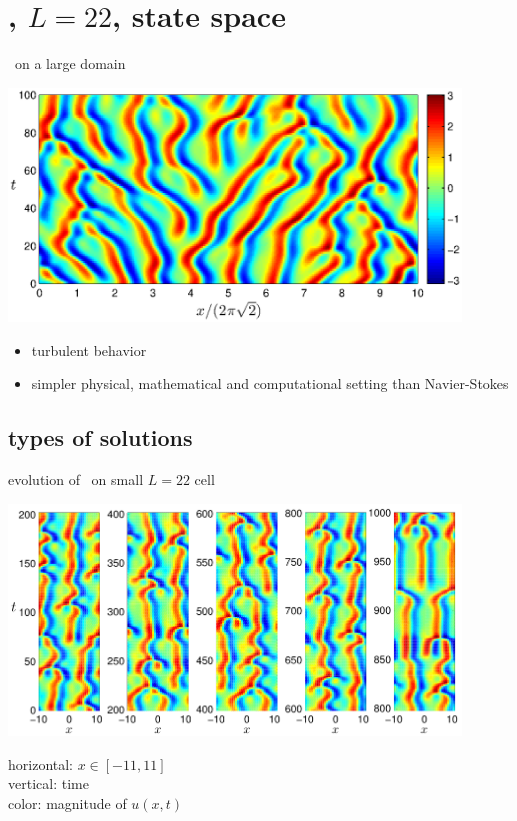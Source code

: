\documentclass{beamer}
\begin{document}
\section[KSe, $L=22$]{\KS, $L=22$, state space }
\begin{frame}{\KS\ on a large domain}

\begin{center}
  \includegraphics[width=0.9\textwidth,height=0.5\textheight,clip=true]
  {../../figs/ks_largeL_cbar}
\end{center}

\begin{itemize}
\item turbulent behavior
\item simpler physical, mathematical and computational setting than Navier-Stokes
\end{itemize}

\end{frame}


\subsection{types of solutions}
\begin{frame}{evolution of \KS\ on small $L=22$ cell}
\begin{center}
  \includegraphics[width=0.9\textwidth,clip=true]{../../figs/ks_L22_long_orbit}
\end{center}
horizontal: $x \in [-11,11]$
\\
vertical: time
\\
color: magnitude of $u(x,t)$
\end{frame}
\end{document}

